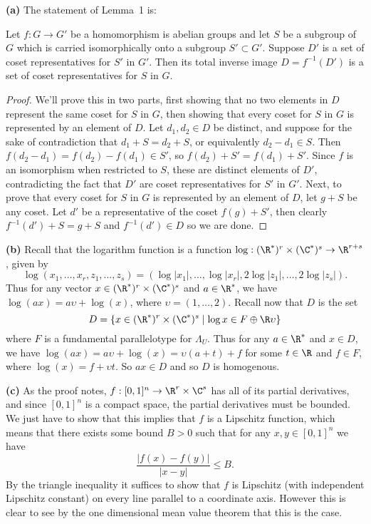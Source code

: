 \documentclass[11pt,letterpaper]{article}
\begin{document}
\begin{solution}
    \textbf{(a)} The statement of Lemma~1 is:
    \begin{ilemma}
        Let $f : G \to G'$ be a homomorphism is abelian groups and let $S$ be a subgroup of $G$ which is carried isomorphically onto a subgroup $S'\subset G'$. Suppose $D'$ is a set of coset representatives for $S'$ in $G'$. Then its total inverse image $D=f^{-1}(D')$ is a set of coset representatives for $S$ in $G$.
    \end{ilemma}
    \begin{proof}
        We'll prove this in two parts, first showing that no two elements in $D$ represent the same coset for $S$ in $G$, then showing that every coset for $S$ in $G$ is represented by an element of $D$. Let $d_1,d_2\in D$ be distinct, and suppose for the sake of contradiction that $d_1+S=d_2+S$, or equivalently $d_2-d_1\in S$. Then $f(d_2-d_1)=f(d_2)-f(d_1)\in S'$, so $f(d_2)+S'=f(d_1)+S'$. Since $f$ is an isomorphism when restricted to $S$, these are distinct elements of $D'$, contradicting the fact that $D'$ are coset representatives for $S'$ in $G'$. Next, to prove that every coset for $S$ in $G$ is represented by an element of $D$, let $g+S$ be any coset. Let $d'$ be a representative of the coset $f(g)+S'$, then clearly $f^{-1}(d')+S=g+S$ and $f^{-1}(d')\in D$ so we are done.
    \end{proof}
    
    \textbf{(b)} Recall that the logarithm function is a function $\log : (\R^*)^r\times (\C^*)^s \to \R^{r+s}$, given by
    \[
        \log(x_1,\ldots,x_r,z_1,\ldots,z_s) = (\log |x_1|, \ldots, \log |x_r|, 2\log |z_1|,\ldots, 2\log |z_s|)
    .\] 
    Thus for any vector $x\in (\R^*)^r\times (\C^*)^s$ and $a\in \R^*$, we have $\log(ax)=a\upsilon+\log(x)$, where $\upsilon = (1,\ldots, 2)$. Recall now that $D$ is the set
    \[
        D = \{x\in (\R^*)^r\times (\C^*)^s\mid \log x\in F\oplus \R\upsilon\}
    \] 
    where $F$ is a fundamental parallelotype for $\Lambda_U$. Thus for any $a\in \R^*$ and $x\in D$, we have $\log (ax)=a\upsilon + \log(x)=\upsilon(a+t)+f$ for some $t\in \R$ and $f\in F$, where $\log(x)=f+\upsilon t$. So $ax\in D$ and so $D$ is homogenous. 

    \textbf{(c)} As the proof notes, $f : [0,1]^n \to \R^r\times \C^s$ has all of its partial derivatives, and since $[0,1]^n$ is a compact space, the partial derivatives must be bounded. We just have to show that this implies that $f$ is a Lipschitz function, which means that there exists some bound $B>0$ such that for any $x,y\in [0,1]^n$ we have
    \[
        \frac{|f(x)-f(y)|}{|x-y|} \leq B
    .\] 
    By the triangle inequality it suffices to show that $f$ is Lipschitz (with independent Lipschitz constant) on every line parallel to a coordinate axis. However this is clear to see by the one dimensional mean value theorem that this is the case.


\end{solution}
\end{document}
